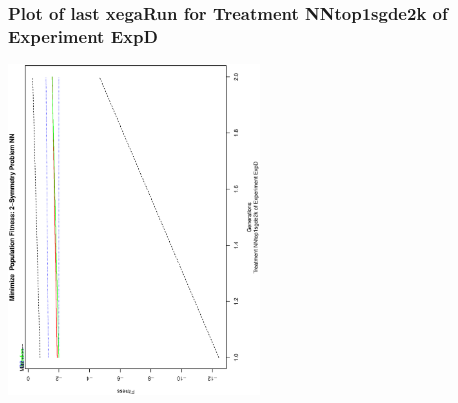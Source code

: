  \begin{frame}
 \frametitle{ Plot of last xegaRun for Treatment NNtop1sgde2k of Experiment ExpD }
 \begin{center}
\includegraphics[width=0.5\textwidth, angle=-90]
{ExpDPlotPopStatsFigure005.eps}
 \end{center}
 \label{report/ExpDPlotPopStatsFigure005.eps}  
 \end{frame}

